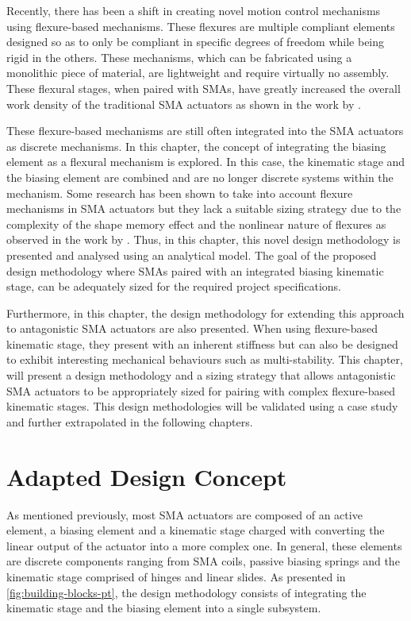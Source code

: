 
Recently, there has been a shift in creating novel motion control mechanisms using flexure-based mechanisms. These flexures are multiple compliant elements designed so as to only be compliant in specific degrees of freedom while being rigid in the others. These mechanisms, which can be fabricated using a monolithic piece of material, are lightweight and require virtually no assembly. These flexural stages, when paired with SMAs, have greatly increased the overall work density of the traditional SMA actuators as shown in the work by \cite{yang88milligramInsectscaleAutonomous2020a}.


These flexure-based mechanisms are still often integrated into the SMA actuators as discrete mechanisms. In this chapter, the concept of integrating the biasing element as a flexural mechanism is explored. In this case, the kinematic stage and the biasing element are combined and are no longer discrete systems within the mechanism. Some research has been shown to take into account flexure mechanisms in SMA actuators but they lack a suitable sizing strategy due to the complexity of the shape memory effect and the nonlinear nature of flexures as observed in the work by \cite{scholtesDevelopmentBistableSMA2021}. Thus, in this chapter, this novel design methodology is presented and analysed using an analytical model. The goal of the proposed design methodology where SMAs paired with an integrated biasing kinematic stage, can be adequately sized for the required project specifications.

Furthermore, in this chapter, the design methodology for extending this approach to antagonistic SMA actuators are also presented. When using flexure-based kinematic stage, they present with an inherent stiffness but can also be designed to exhibit interesting mechanical behaviours such as multi-stability. This chapter, will present a design methodology and a sizing strategy that allows antagonistic SMA actuators to be appropriately sized for pairing with complex flexure-based kinematic stages. This design methodologies will be validated using a case study and further extrapolated in the following chapters.

\section{Adapted Design Concept}
As mentioned previously, most SMA actuators are composed of an active element, a biasing element and a kinematic stage charged with converting the linear output of the actuator into a more complex one. In general, these elements are discrete components ranging from SMA coils, passive biasing springs and the kinematic stage comprised of hinges and linear slides. As presented in \cref{fig:building-blocks-pt}, the design methodology consists of integrating the kinematic stage and the biasing element into a single subsystem.

